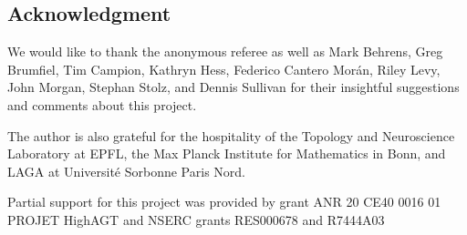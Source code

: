
\subsection*{Acknowledgment}

We would like to thank the anonymous referee as well as Mark Behrens, Greg Brumfiel, Tim Campion, Kathryn Hess, Federico Cantero Mor\'an, Riley Levy, John Morgan, Stephan Stolz, and Dennis Sullivan for their insightful suggestions and comments about this project.

The author is also grateful for the hospitality of the Topology and Neuroscience Laboratory at EPFL, the Max Planck Institute for Mathematics in Bonn, and LAGA at Universit\'e Sorbonne Paris Nord.

Partial support for this project was provided by grant ANR 20 CE40 0016 01 PROJET HighAGT and NSERC grants RES000678 and R7444A03